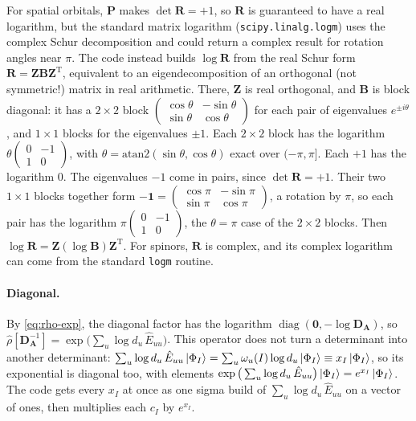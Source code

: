 \documentclass[aip,jcp,preprint]{revtex4-1}
\newcommand{\bvec}[1]{\mathbf{#1}}
\newcommand{\diag}{\operatorname{diag}}
\begin{document}
For spatial orbitals, $\bvec{P}$ makes $\det\bvec{R} = +1$, so $\bvec{R}$ is guaranteed to have a real logarithm, but the standard matrix logarithm (\texttt{scipy.linalg.logm}) uses the complex Schur decomposition and could return a complex result for rotation angles near $\pi$.
The code instead builds $\log\bvec{R}$ from the real Schur form $\bvec{R} = \bvec{Z}\bvec{B}\bvec{Z}^\mathrm{T}$, equivalent to an eigendecomposition of an orthogonal (not symmetric!) matrix in real arithmetic.
There, $\bvec{Z}$ is real orthogonal, and $\bvec{B}$ is block diagonal: it has a $2\times2$ block $\left(\begin{smallmatrix}\cos\theta & -\sin\theta\\ \sin\theta & \cos\theta\end{smallmatrix}\right)$ for each pair of eigenvalues $e^{\pm i\theta}$, and $1\times1$ blocks for the eigenvalues $\pm1$.
Each $2\times2$ block has the logarithm $\theta\left(\begin{smallmatrix}0 & -1\\ 1 & 0\end{smallmatrix}\right)$, with $\theta = \mathrm{atan2}(\sin\theta, \cos\theta)$ exact over $(-\pi, \pi]$.
Each $+1$ has the logarithm 0.
The eigenvalues $-1$ come in pairs, since $\det\bvec{R} = +1$.
Their two $1\times1$ blocks together form $-\bvec{1} = \left(\begin{smallmatrix}\cos\pi & -\sin\pi\\ \sin\pi & \cos\pi\end{smallmatrix}\right)$, a rotation by $\pi$, so each pair has the logarithm $\pi\left(\begin{smallmatrix}0 & -1\\ 1 & 0\end{smallmatrix}\right)$, the $\theta = \pi$ case of the $2\times2$ blocks.
Then $\log\bvec{R} = \bvec{Z}(\log\bvec{B})\bvec{Z}^\mathrm{T}$.
For spinors, $\bvec{R}$ is complex, and its complex logarithm can come from the standard \texttt{logm} routine.

\paragraph{Diagonal.}
By \cref{eq:rho-exp}, the diagonal factor has the logarithm $\diag(\bvec{0}, -\log\bvec{D}_{\bvec{A}})$, so $\hat{\rho}[\bvec{D}_{\bvec{A}}^{-1}] = \exp\big(\sum_u \log d_u\,\hat{E}_{uu}\big)$.
This operator does not turn a determinant into another determinant: $\sum_u \log d_u\,\hat{E}_{uu}\ket{\Phi_I} = \sum_u \omega_u(I)\log d_u\ket{\Phi_I}\equiv x_I\ket{\Phi_I}$, so its exponential is diagonal too, with elements $\exp\big(\sum_u \log d_u\,\hat{E}_{uu}\big)\ket{\Phi_I} = e^{x_I}\ket{\Phi_I}$.
The code gets every $x_I$ at once as one sigma build of $\sum_u \log d_u\,\hat{E}_{uu}$ on a vector of ones, then multiplies each $c_I$ by $e^{x_I}$.
\end{document}
